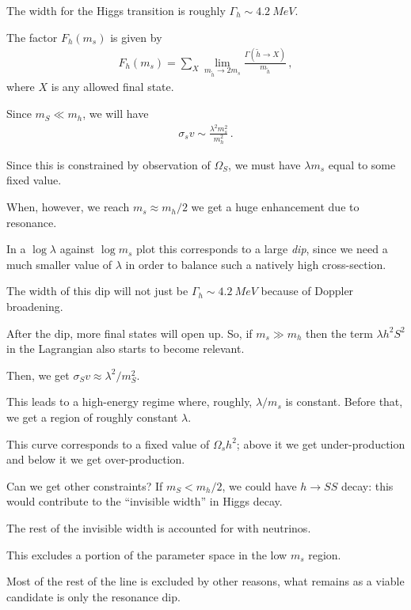 \documentclass[main.tex]{subfiles}
\begin{document}
The width for the Higgs transition is roughly \(\Gamma _h \sim \SI{4.2}{MeV}\). 

The factor \(F_h(m_s)\) is given by 
%
\begin{align}
F_h (m_s) = \sum _{X} \lim_{m_{\widetilde{h}} \to 2 m_s} \frac{\Gamma (\widetilde{h} \to X )}{m_{ \widetilde{h}}}
\,,
\end{align}
%
where \(X\) is any allowed final state. 

Since \(m_S \ll m_h\), we will have 
%
\begin{align}
\sigma _s v \sim \frac{\lambda^2 m_s^2}{m_h^2}
\,.
\end{align}

Since this is constrained by observation of \(\Omega _S\), we must have \(\lambda m_s\) equal to some fixed value. 

When, however, we reach \(m_s \approx m_h/2\) we get a huge enhancement due to resonance. 

In a \(\log \lambda \) against \(\log m_s\) plot this corresponds to a large \emph{dip}, since we need a much smaller value of \(\lambda \) in order to balance such a natively high cross-section. 

The width of this dip will not just be \(\Gamma _h \sim \SI{4.2}{MeV}\) because of Doppler broadening. 

After the dip, more final states will open up. 
So, if \(m_s \gg m_h\) then the term \(\lambda h^2S^2\) in the Lagrangian also starts to become relevant. 

Then, we get \(\sigma _S v \approx \lambda^2 / m_S^2\). 

This leads to a high-energy regime where, roughly, \(\lambda / m_s\) is constant. 
Before that, we get a region of roughly constant \(\lambda \). 

This curve corresponds to a fixed value of \(\Omega _s h^2\); above it we get under-production and below it we get over-production.

Can we get other constraints? 
If \(m_S < m_h / 2\), we could have \(h \to SS\) decay: this would contribute to the ``invisible width'' in Higgs decay. 

The rest of the invisible width is accounted for with neutrinos. 

This excludes a portion of the parameter space in the low \(m_s\) region. 

Most of the rest of the line is excluded by other reasons, what remains as a viable candidate is only the resonance dip. 
\end{document}
